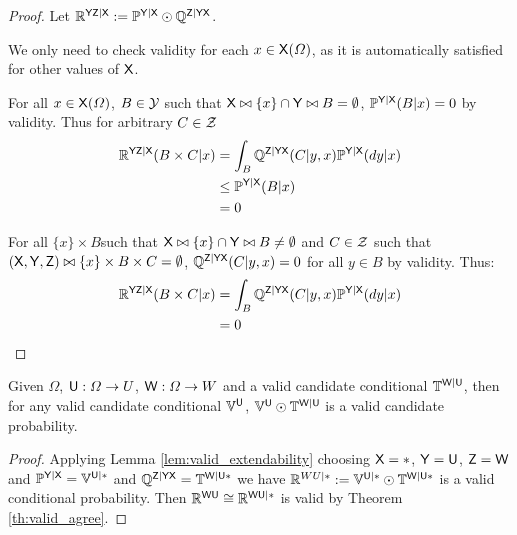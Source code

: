 \begin{proof}
Let $\mathbb{R}^{\mathsf{YZ}|\mathsf{X}}:=\mathbb{P}^{\mathsf{Y}|\mathsf{X}}\odot \mathbb{Q}^{\mathsf{Z}|\mathsf{Y}\mathsf{X}}$.

We only need to check validity for each $x\in \mathsf{X}(\Omega)$, as it is automatically satisfied for other values of $\mathsf{X}$.

For all $x\in \mathsf{X}(\Omega)$, $B\in \mathcal{Y}$ such that $\mathsf{X}\bowtie \{x\}\cap\mathsf{Y}\bowtie B=\emptyset$, $\mathbb{P}^{\mathsf{Y}|\mathsf{X}}(B|x)=0$ by validity. Thus for arbitrary $C\in \mathcal{Z}$
\begin{align}
	\mathbb{R}^{\mathsf{YZ}|\mathsf{X}}(B\times C|x) &= \int_B \mathbb{Q}^{\mathsf{Z}|\mathsf{YX}}(C|y,x)\mathbb{P}^{\mathsf{Y}|\mathsf{X}}(dy|x)\\
								  &\leq \mathbb{P}^{\mathsf{Y}|\mathsf{X}}(B|x)\\
								  &=0
\end{align}

For all $\{x\}\times B$such that $\mathsf{X}\bowtie \{x\}\cap\mathsf{Y}\bowtie B\neq \emptyset$ and $C\in \mathcal{Z}$ such that $(\mathsf{X},\mathsf{Y},\mathsf{Z})\bowtie \{x\}\times B\times C=\emptyset$, $\mathbb{Q}^{\mathsf{Z}|\mathsf{YX}}(C|y,x)=0$ for all $y\in B$ by validity. Thus:
\begin{align}
	\mathbb{R}^{\mathsf{YZ}|\mathsf{X}}(B\times C|x) &= \int_B \mathbb{Q}^{\mathsf{Z}|\mathsf{YX}}(C|y,x)\mathbb{P}^{\mathsf{Y}|\mathsf{X}}(dy|x)\\
								  			&=0
\end{align}
\end{proof}

\begin{corollary}\label{corr:valid_extend_order1}
Given $\Omega$, $\mathsf{U}:\Omega\to U$, $\mathsf{W}:\Omega\to W$ and a valid candidate conditional $\mathbb{T}^{\mathsf{W}|\mathsf{U}}$, then for any valid candidate conditional $\mathbb{V}^{\mathsf{U}}$, $\mathbb{V}^{\mathsf{U}}\odot \mathbb{T}^{\mathsf{W}|\mathsf{U}}$ is a valid candidate probability.
\end{corollary}

\begin{proof}
Applying Lemma \ref{lem:valid_extendability} choosing $\mathsf{X}=*$, $\mathsf{Y}=\mathsf{U}$, $\mathsf{Z}=\mathsf{W}$ and $\mathbb{P}^{\mathsf{Y}|\mathsf{X}}=\mathbb{V}^{\mathsf{U}|*}$ and $\mathbb{Q}^{\mathsf{Z}|\mathsf{YX}}=\mathbb{T}^{\mathsf{W}|\mathsf{U*}}$ we have $\mathbb{R}^{WU|*}:=\mathbb{V}^{\mathsf{U}|*}\odot \mathbb{T}^{\mathsf{W}|\mathsf{U}*}$ is a valid conditional probability. Then $\mathbb{R}^{\mathsf{WU}}\cong \mathbb{R}^{\mathsf{WU}|*}$ is valid by Theorem \ref{th:valid_agree}.
\end{proof}

